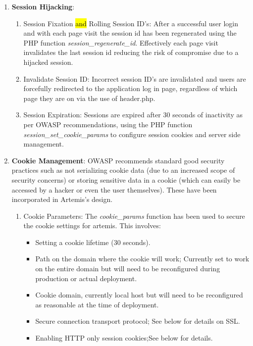 \begin{enumerate}
    \begin{enumerate}
        \item \textbf{Session Hijacking}: 
        \begin{enumerate}
            \item Session Fixation\cite{OWASPa} \hl{and} Rolling Session ID's: After a successful user login and with each page visit the session id has been regenerated using the PHP function \textit{session\_regenerate\_id}. Effectively each page visit invalidates the last session id reducing the risk of compromise due to a hijacked session.
            \item Invalidate Session ID: Incorrect session ID's are invalidated and users are forcefully redirected to the application log in page, regardless of which page they are on via the use of header.php.
            \item Session Expiration: Sessions are expired after 30 seconds of inactivity as per OWASP recommendations, using the PHP function \textit{session\_set\_cookie\_params} to configure session cookies and server side management.
        \end{enumerate}
        \item \textbf{Cookie Management}:
        OWASP \cite{OWASPa} recommends standard good security practices such as not serializing cookie data (due to an increased scope of security concerns) or storing sensitive data in a cookie (which can easily be accessed by a hacker or even the user themselves).  These have been incorporated in Artemis's design.
        \begin{enumerate}
            \item Cookie Parameters: The \textit{cookie\_params} function has been used to secure the cookie settings for artemis. This involves:
                \begin{itemize}
                    \item Setting a cookie lifetime (30 seconds).
                    \item Path on the domain where the cookie will work; Currently set to work on the entire domain but will need to be reconfigured during production or actual deployment.
                    \item Cookie domain, currently local host but will need to be reconfigured as reasonable at the time of deployment.
                    \item Secure connection transport protocol; See below for details on SSL.
                    \item Enabling HTTP only session cookies;See below for details.

\end{itemize}
\end{enumerate}
\end{enumerate}
\end{enumerate}
